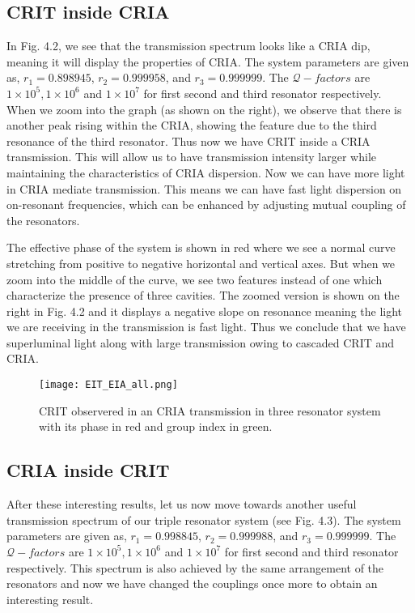 \subsection{CRIT inside CRIA}
In Fig. 4.2, we see that the transmission spectrum looks like a CRIA dip, meaning it will display the properties of CRIA. The system parameters are given as, $r_{1} = 0.898945$, $r_{2} = 0.999958$, and $r_{3} = 0.999999$. The $\mathcal{Q}-factors$ are $1\times10^{5}, 1\times10^{6}$ and $1\times10^{7}$ for first second and third resonator respectively. When we zoom into the graph (as shown on the right), we observe that there is another peak rising within the CRIA, showing the feature due to the third resonance of the third resonator. Thus now we have CRIT inside a CRIA transmission. This will allow us to have transmission intensity larger while maintaining the characteristics of CRIA dispersion. Now we can have more light in CRIA mediate transmission. This means we can have fast light dispersion on on-resonant frequencies, which can be enhanced by adjusting mutual coupling of the resonators.

The effective phase of the system is shown in red where we see a normal curve stretching from positive to negative horizontal and vertical axes. But when we zoom into the middle of the curve, we see two features instead of one which characterize the presence of three cavities. The zoomed version is shown on the right in Fig. 4.2 and it displays a negative slope on resonance meaning the light we are receiving in the transmission is fast light. Thus we conclude that we have superluminal light along with large transmission owing to cascaded CRIT and CRIA.

\begin{figure}[t]
\centering
\texttt{[image: EIT\_EIA\_all.png]}
\caption{CRIT observered in an CRIA transmission in three resonator system with its phase in red and group index in green.}
\end{figure}

\newpage
\subsection{CRIA inside CRIT}

After these interesting results, let us now move towards another useful transmission spectrum of our triple resonator system (see Fig. 4.3). The system parameters are given as, $r_{1} = 0.998845$, $r_{2} = 0.999988$, and $r_{3} = 0.999999$. The $\mathcal{Q}-factors$ are $1\times10^{5}, 1\times10^{6}$ and $1\times10^{7}$ for first second and third resonator respectively. This spectrum is also achieved by the same arrangement of the resonators and now we have changed the couplings once more to obtain an interesting result. 

